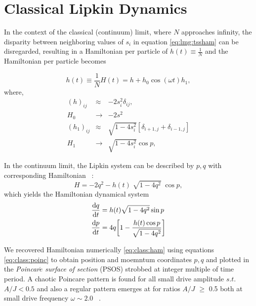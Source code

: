 \documentclass[%
reprint,
superscriptaddress,
amsmath,amssymb,
aps,
prb,
showkeys,
]{revtex4-2}
\begin{document}
	\section{\label{sec:level4}Classical Lipkin Dynamics}
	In the context of the classical (continuum) limit, where $N$ approaches infinity, the disparity between neighboring values of $s_i$ in equation \ref{eq:lmg:tssham} can be disregarded, resulting in a Hamiltonian per particle of $h(t)\equiv \frac{1}{N}$ and the Hamiltonian per particle becomes
	
	\begin{equation}
	h(t)\equiv \frac{1}{N}H(t) = h + h_0\cos{(\omega t)}h_1,
	\end{equation}
	where,
	\begin{eqnarray}
	(h)_{ij} &\approx& - 2s^2_i \delta_{ij},\nonumber\\
	H_0 &\rightarrow& -2s^2\nonumber\\
	(h_1)_{ij} &\approx& \sqrt{1 - 4s^2_i}\left[\delta_{i+1, j}  + \delta_{i-1,j}\right]\nonumber\\
	H_1 &\rightarrow& \sqrt{1 - 4s^2_i}\cos{p},
	\end{eqnarray}
	
	In the continuum limit, the Lipkin system can be described by $p,q$ with corresponding Hamiltonian ~\cite{sciolla_quantum_2010}:
	\begin{equation}
	H = -2 q^2 - h(t)\;\sqrt{1-4q^2}\;\cos{p},
	\label{eq:class:ham}
	\end{equation}
	which yields the Hamiltonian dynamical system 
	\begin{align}
		\dv{q}{t} &= h(t)\sqrt{1-4q^2}\sin{p}\nonumber \\
		\dv{p}{t} &= 4q\bigg[1-\frac{h(t)\cos{p}}{\sqrt{1-4q^2}}\bigg]
		\label{eq:class:poinc}
	\end{align}
	
	We recovered Hamiltonian numerically \ref{eq:class:ham} using equations \ref{eq:class:poinc} to obtain position and moemntum coordinates $p,q$ and plotted in the \emph{Poincar$\acute{e}$ surface of section} (PSOS) strobbed at integer multiple of time period. A chaotic Poincare pattern is found for all small drive amplitude $s.t.$  $A/J < 0.5 $ and also a regular pattern emerges at for ratios $A/J$ $\geq$ 0.5 both at small drive frequency $\omega \sim 2.0$ ~\cite{russomanno_thermalization_2015}. 
	
\end{document}
